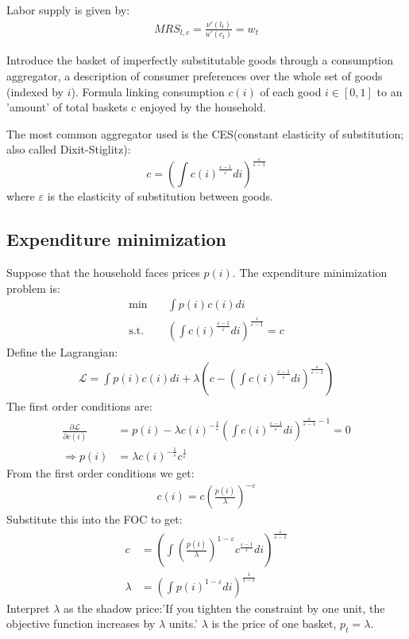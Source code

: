 Labor supply is given by:
\begin{align*}
    MRS_{l,c} = \frac{\nu'(l_t)}{u'(c_t)} = w_t
\end{align*}

Introduce the basket of imperfectly substitutable goods
through a consumption aggregator, a description of consumer
preferences over the whole set of goods (indexed by $i$).
Formula linking consumption $c(i)$ of each good $i \in [0, 1]$ to
an 'amount' of total baskets c enjoyed by the household.

The most common aggregator used is the CES(constant
elasticity of substitution; also called Dixit-Stiglitz):
\[ 
c = \left(\int c(i)^{\frac{\varepsilon-1}{\varepsilon}} di\right)^{\frac{\varepsilon}{\varepsilon-1}}
\]
where $\varepsilon$ is the elasticity of substitution between goods.

\subsection{Expenditure minimization}
Suppose that the household faces prices $p(i)$. The expenditure minimization problem is:
\begin{align*}
    \min &\quad \int p(i) c(i) di \\
    \text{s.t.} &\quad \left(\int c(i)^{\frac{\varepsilon-1}{\varepsilon}} di\right)^{\frac{\varepsilon}{\varepsilon-1}} = c
\end{align*}
Define the Lagrangian:
\begin{align*}
    \mathcal{L} = \int p(i) c(i) di + \lambda \left( c - \left(\int c(i)^{\frac{\varepsilon-1}{\varepsilon}} di\right)^{\frac{\varepsilon}{\varepsilon-1}} \right)
\end{align*}
The first order conditions are:
\begin{align*}
    \frac{\partial \mathcal{L}}{\partial c(i)} &= p(i) - \lambda c(i)^{-\frac{1}{\varepsilon}}\left(\int c(i)^{\frac{\varepsilon-1}{\varepsilon}} di\right)^{\frac{\varepsilon}{\varepsilon-1}-1} = 0 \\
    \Rightarrow p(i) &= \lambda c(i)^{-\frac{1}{\varepsilon}}c^{\frac{1}{\varepsilon}}
\end{align*}
From the first order conditions we get:
\begin{align*}
    c(i) = c \left( \frac{p(i)}{\lambda} \right)^{-\varepsilon}
\end{align*}
Substitute this into the FOC to get:
\begin{align*}
    c &= \left( \int \left(\frac{p(i)}{\lambda }\right)^{1-\varepsilon} c^{\frac{\varepsilon-1}{\varepsilon}} di \right)^{\frac{\varepsilon}{\varepsilon-1}} \\
    \lambda &= \left( \int p(i)^{1-\varepsilon} di \right)^{\frac{1}{1-\varepsilon}}
\end{align*}
Interpret $\lambda$ as the shadow price:'If you tighten the
constraint by one unit, the objective function increases by $\lambda$ units.'
$\lambda$ is the price of one basket, $p_t = \lambda$.

